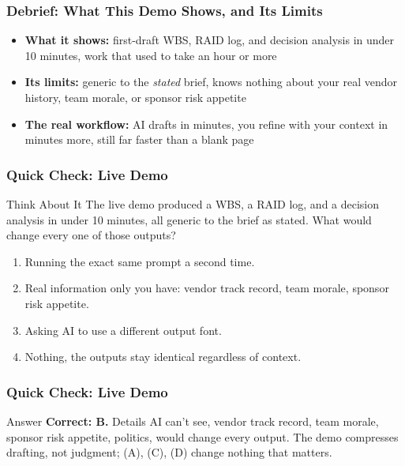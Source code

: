 \begin{frame}[fragile]\frametitle{Debrief: What This Demo Shows, and Its Limits}

\begin{itemize}
  \item \textbf{What it shows:} first-draft WBS, RAID log, and decision analysis in under 10 minutes, work that used to take an hour or more
  \item \textbf{Its limits:} generic to the \textit{stated} brief, knows nothing about your real vendor history, team morale, or sponsor risk appetite
  \item \textbf{The real workflow:} AI drafts in minutes, you refine with your context in minutes more, still far faster than a blank page
\end{itemize}

\end{frame}

\begin{frame}[fragile]\frametitle{Quick Check: Live Demo}
\begin{block}{Think About It}
The live demo produced a WBS, a RAID log, and a decision analysis in under 10 minutes, all generic to the brief as stated. What would change every one of those outputs?
\begin{enumerate}
  \item[A.] Running the exact same prompt a second time.
  \item[B.] Real information only you have: vendor track record, team morale, sponsor risk appetite.
  \item[C.] Asking AI to use a different output font.
  \item[D.] Nothing, the outputs stay identical regardless of context.
\end{enumerate}
\end{block}
\end{frame}

\begin{frame}[fragile]\frametitle{Quick Check: Live Demo}
\begin{block}{Answer}
\textbf{Correct: B.} Details AI can't see, vendor track record, team morale, sponsor risk appetite, politics, would change every output. The demo compresses drafting, not judgment; (A), (C), (D) change nothing that matters.
\end{block}
\end{frame}

